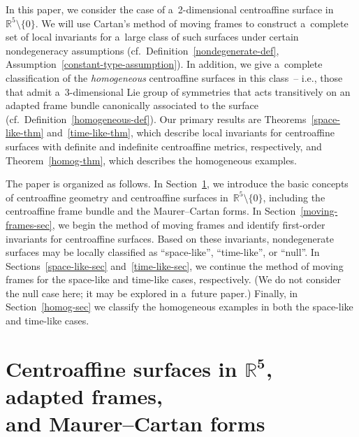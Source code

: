 \documentclass[pdftex]{sigma}
\numberwithin{equation}{section}
\theoremstyle{definition}
\begin{document}
In this paper, we consider the case of a~2-dimensional centroaf\/f\/ine surface in $\mathbb{R}^5 \setminus \{0 \}$.
We will use Cartan's method of moving frames to construct a~complete set of local invariants for a~large class of such
surfaces under certain nondegeneracy assumptions (cf.\ Def\/inition~\ref{nondegenerate-def},
Assumption~\ref{constant-type-assumption}).
In addition, we give a~complete classif\/ication of the {\em homogeneous} centroaf\/f\/ine surfaces in this class~-- i.e.,
those that admit a~3-dimensional Lie group of symmetries that acts transitively on an adapted frame bundle canonically
associated to the surface (cf.\ Def\/inition~\ref{homogeneous-def}).
Our primary results are Theorems~\ref{space-like-thm} and~\ref{time-like-thm}, which describe local invariants for
centroaf\/f\/ine surfaces with def\/inite and indef\/inite centroaf\/f\/ine metrics, respectively, and Theorem~\ref{homog-thm},
which describes the homogeneous examples.

The paper is organized as follows.
In Section~\ref{background-sec}, we introduce the basic concepts of centroaf\/f\/ine geometry and centroaf\/f\/ine surfaces
in~$\mathbb{R}^5 \setminus \{0 \}$, including the centroaf\/f\/ine frame bundle and the Maurer--Cartan forms.
In Section~\ref{moving-frames-sec}, we begin the method of moving frames and identify f\/irst-order invariants for
centroaf\/f\/ine surfaces.
Based on these invariants, nondegenerate surfaces may be locally classif\/ied as ``space-like'', ``time-like'', or ``null''.
In Sections~\ref{space-like-sec} and~\ref{time-like-sec}, we continue the method of moving frames for the space-like and
time-like cases, respectively.
(We do not consider the null case here; it may be explored in a~future paper.) Finally, in Section~\ref{homog-sec} we
classify the homogeneous examples in both the space-like and time-like cases.

\section[Centroaf\/f\/ine surfaces in $\mathbb{R}^5$, adapted frames, and Maurer--Cartan forms]{Centroaf\/f\/ine surfaces
in $\boldsymbol{\mathbb{R}^5}$, adapted frames,\\ and Maurer--Cartan forms}
\label{background-sec}
\end{document}
